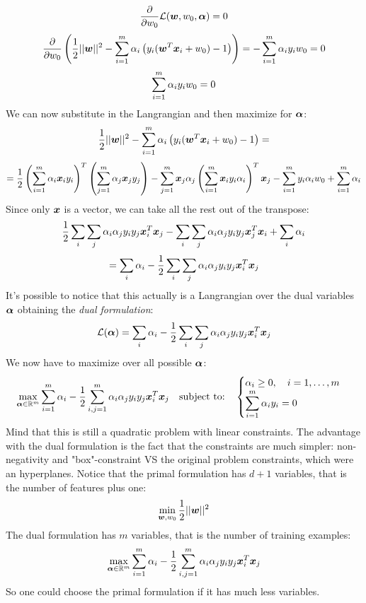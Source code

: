 \[\frac{\partial}{\partial w_0}\mathcal{L}(\bm{w},w_0,\bm{\alpha})=0\]
\[\frac{\partial}{\partial w_0}\left(\frac{1}{2}\vert\vert\bm{w}\vert\vert^2-\displaystyle\sum_{i=1}^m\alpha_i\left(y_i(\bm{w}^T\bm{x}_i+w_0)-1\right)\right)=-\displaystyle\sum_{i=1}^m\alpha_iy_iw_0=0\]
\[\displaystyle\sum_{i=1}^m\alpha_iy_iw_0=0\]
We can now substitute in the Langrangian and then maximize for $\bm{\alpha}$:
\[\frac{1}{2}\vert\vert\bm{w}\vert\vert^2-\displaystyle\sum_{i=1}^m\alpha_i\left(y_i(\bm{w}^T\bm{x}_i+w_0)-1\right)=\]
\[=\frac{1}{2}\left(\displaystyle\sum_{i=1}^m\alpha_i\bm{x}_iy_i\right)^T\left(\displaystyle\sum_{j=1}^m \alpha_j\bm{x}_jy_j\right)-\displaystyle\sum_{j=1}^m\bm{x}_j\alpha_j\left(\displaystyle\sum_{i=1}^m\bm{x}_iy_i\alpha_i\right)^T\bm{x}_j-\displaystyle\sum_{i=1}^my_i\alpha_iw_0+\displaystyle\sum_{i=1}^m \alpha_i\]
Since only $\bm{x}$ is a vector, we can take all the rest out of the transpose:
\[\frac{1}{2}\displaystyle\sum_i\displaystyle\sum_j\alpha_i\alpha_jy_iy_j\bm{x}_i^T\bm{x}_j-\displaystyle\sum_i\displaystyle\sum_j\alpha_i\alpha_jy_iy_j\bm{x}_j^T\bm{x}_i+\displaystyle\sum_i\alpha_i\]
\[=\displaystyle\sum_i\alpha_i-\frac{1}{2}\displaystyle\sum_i\displaystyle\sum_j\alpha_i\alpha_jy_iy_j\bm{x}_i^T\bm{x}_j\]
It's possible to notice that this actually is a Langrangian over the dual variables $\bm{\alpha}$ obtaining the \textit{dual formulation}:
\begin{equation}
  \mathcal{L}(\bm{\alpha})=\displaystyle\sum_i\alpha_i-\frac{1}{2}\displaystyle\sum_i\displaystyle\sum_j\alpha_i\alpha_jy_iy_j\bm{x}_i^T\bm{x}_j
  \label{eq:DualFormulation}
\end{equation}
We now have to maximize over all possible $\bm{\alpha}$:
\[
  \max\limits_{\bm{\alpha}\in\mathbb{R}^m}\displaystyle\sum_{i=1}^m\alpha_i-\frac{1}{2}\displaystyle\sum_{i,j=1}^m\alpha_i\alpha_jy_iy_j\bm{x}_i^T\bm{x}_j\quad\text{subject to:}\quad 
\begin{cases}
  \alpha_i\geq0,\quad i=1,\hdots, m\\
  \displaystyle\sum_{i=1}^m\alpha_iy_i=0
\end{cases}
\]
Mind that this is still a quadratic problem with linear constraints. The advantage with the dual formulation is the fact that the constraints are much simpler: non-negativity and "box"-constraint VS the original problem constraints, which were an hyperplanes. \newline
Notice that the primal formulation has $d+1$ variables, that is the number of features plus one:
\[\min\limits_{\bm{w},w_0}\frac{1}{2}\vert\vert\bm{w}\vert\vert^2\]
The dual formulation has $m$ variables, that is the number of training examples:
\[\max\limits_{\bm{\alpha}\in\mathbb{R}^m}\displaystyle\sum_{i=1}^m\alpha_i-\frac{1}{2}\displaystyle\sum_{i,j=1}^m\alpha_i\alpha_jy_iy_j\bm{x}_i^T\bm{x}_j\]
So one could choose the primal formulation if it has much less variables. \newline
